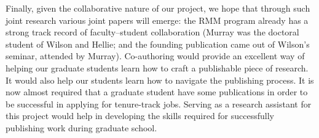 \documentclass[12pt]{article}
\begin{document}
Finally, given the collaborative nature of our project, we hope that through
such joint research various joint papers will emerge: the RMM program already has a
strong track record of faculty--student collaboration (Murray was the
doctoral student of Wilson and Hellie; and the founding publication came out
of Wilson's seminar, attended by Murray).  Co-authoring would provide an
excellent way of helping our graduate students learn how to craft a publishable
piece of research. It would also help our students learn how to navigate the
publishing process. It is now almost required that a graduate student have
some publications in order to be successful in applying for tenure-track jobs.
Serving as a research assistant for this project would help in developing the
skills required for successfully publishing work during graduate school.



\end{document}
